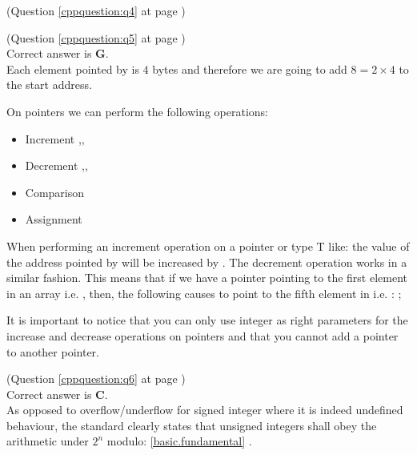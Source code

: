 \begin{cppanswer}
    \label{cppquestion:s4}
    (Question \ref{cppquestion:q4} at page \pageref{cppquestion:q4}) \hfill \\

\end{cppanswer}

\begin{cppanswer}
    \label{cppquestion:s5}
    (Question \ref{cppquestion:q5} at page \pageref{cppquestion:q5}) \hfill \\
    Correct answer is \textbf{G}. \\
    Each element pointed by  is $4$ bytes and therefore we are going to add $8=2\times 4$ to the start address.

    On pointers we can perform the following operations:
    \begin{itemize}
        \item Increment \inline{++},\inline{+},\inline{+=}
        \item Decrement \inline{--},\inline{-},\inline{-=}
        \item Comparison \inline{==}
        \item Assignment \inline{=}
    \end{itemize}

    When performing an increment operation on a pointer  or type T like:  the value of the address pointed by  will be increased by . The decrement operation works in a similar fashion.
    This means that if we have a  pointer  pointing to the first element in an array  i.e. , then, the following causes  to point to the fifth element in  i.e. :   ;

    It is important to notice that you can only use integer as right parameters for the increase and decrease operations on pointers and that you cannot add a pointer to another pointer.
\end{cppanswer}


\begin{cppanswer}
    \label{cppquestion:s6}
    (Question \ref{cppquestion:q6} at page \pageref{cppquestion:q6}) \hfill \\
    Correct answer is \textbf{C}. \\
    As opposed to overflow/underflow for signed integer where it is indeed undefined behaviour, the standard clearly states that unsigned integers shall obey the arithmetic under $2^n$ modulo:  \href{https://eel.is/c++draft/basic.fundamental#2}{[basic.fundamental]} .
   
\end{cppanswer}


